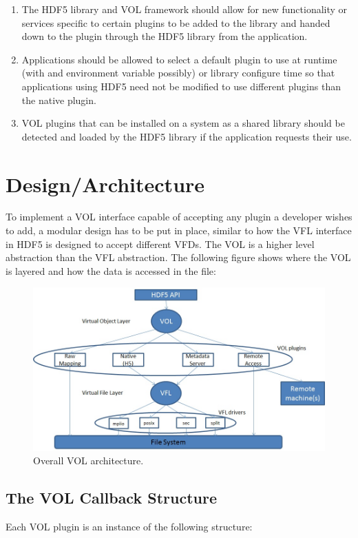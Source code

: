 \documentclass[letterpaper,hyper]{THG_RFC}
\begin{document}
\begin{enumerate}
\item The HDF5 library and VOL framework should allow for new functionality or services specific to certain plugins to be added to the library and handed down to the plugin through the HDF5 library from the application.
\item Applications should be allowed to select a default plugin to use at runtime (with and environment variable possibly) or library configure time so that applications using HDF5 need not be modified to use different plugins than the native plugin.
\item VOL plugins that can be installed on a system as a shared library should be detected and loaded by the HDF5 library if the application requests their use.
\end{enumerate}
\section{Design/Architecture}
To implement a VOL interface capable of accepting any plugin a developer wishes to add, a modular design has to be put in place, similar to how the VFL interface in HDF5 is designed to accept different VFDs. The VOL is a higher level abstraction than the VFL abstraction. The following figure shows where the VOL is layered and how the data is accessed in the file:

\begin{figure}[ht!]
\centering
\includegraphics[width=170mm]{pics/vol-arch.jpg}
\caption{Overall VOL architecture.}
\label{fig:vol-arch}
\end{figure}

\subsection{The VOL Callback Structure}
Each VOL plugin is an instance of the following structure:
\end{document}
